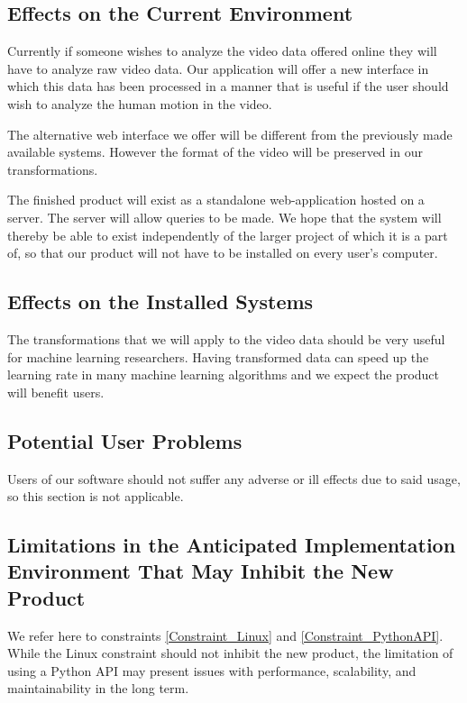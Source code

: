 \documentclass{scrreprt}
\begin{document}
\subsection{Effects on the Current Environment}

{Currently if someone wishes to analyze the video data offered online
they will have to analyze raw video data. Our application will offer a
new interface in which this data has been processed in a manner that is
useful if the user should wish to analyze the human motion in the
video.}

{The alternative web interface we offer will be different from the previously
made available systems. However the format of the video will be preserved in
our transformations.}

{The finished product will exist as a standalone web-application hosted on a
server. The server will allow queries to be made. We hope that the system
will thereby be able to exist independently of the larger project of which it
is a part of, so that our product will not have to be installed on every user's
computer.}

\subsection{Effects on the Installed Systems}

{The transformations that we will apply to the video data should be very
useful for machine learning researchers. Having transformed data can
speed up the learning rate in many machine learning algorithms and we
expect the product will benefit users.}

\subsection{Potential User Problems}

Users of our software should not suffer any adverse or ill effects due to said
usage, so this section is not applicable.

\subsection{Limitations in the Anticipated Implementation Environment That May
            Inhibit the New Product}

We refer here to constraints \ref{Constraint_Linux} and \ref{Constraint_PythonAPI}.
While the Linux constraint should not inhibit the new product, the limitation
of using a Python API may present issues with performance, scalability, and
maintainability in the long term.
\end{document}
